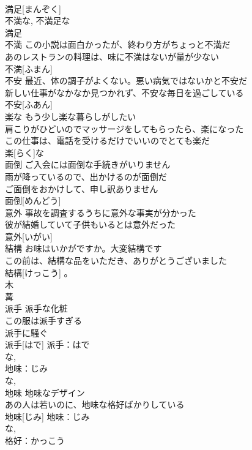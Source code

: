 \documentclass[8pt]{extreport}
\begin{document}
\begin{CJK}{UTF8}{min}
\\	満足[まんぞく]			
\\	不満な, 不満足な 
\\	満足 
\\	不満	この小説は面白かったが、終わり方がちょっと不満だ 
\\	あのレストランの料理は、味に不満はないが量が少ない 
\\	不満[ふまん]			
\\	不安	最近、体の調子がよくない。悪い病気ではないかと不安だ 
\\	新しい仕事がなかなか見つかれず、不安な毎日を過ごしている 
\\	不安[ふあん]						
\\	楽な	もう少し楽な暮らしがしたい 
\\	肩こりがひどいのでマッサージをしてもらったら、楽になった 
\\	この仕事は、電話を受けるだけでいいのでとても楽だ 
\\	楽[らく]な						
\\	面倒	ご入会には面倒な手続きがいりません 
\\	雨が降っているので、出かけるのが面倒だ 
\\	ご面倒をおかけして、申し訳ありません 
\\	面倒[めんどう]			
\\	意外	事故を調査するうちに意外な事実が分かった 
\\	彼が結婚していて子供もいるとは意外だった 
\\	意外[いがい]			
\\	結構	お味はいかがですか。大変結構です 
\\	この前は、結構な品をいただき、ありがとうございました 
\\	結構[けっこう]		。	
\\	木 
\\	冓 
\\	派手	派手な化粧 
\\	この服は派手すぎる 
\\	派手に騒ぐ 
\\	派手[はで]			派手：はで
\\	な, 
\\	地味：じみ
\\	な, 
\\	地味	地味なデザイン 
\\	あの人は若いのに、地味な格好ばかりしている 
\\	地味[じみ]			地味：じみ
\\	な, 
\\	格好：かっこう

\end{CJK}
\end{document}
